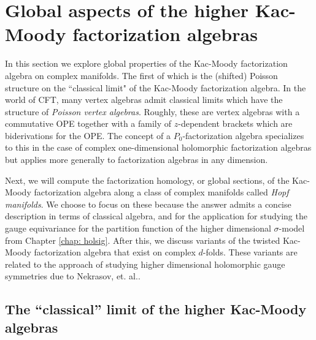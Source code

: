 \documentclass[10pt]{amsart}
\begin{document}


\section{Global aspects of the higher Kac-Moody factorization algebras}

In this section we explore global properties of the Kac-Moody factorization algebra on complex manifolds. 
The first of which is the (shifted) Poisson structure on the ``classical limit" of the Kac-Moody factorization algebra.
In the world of CFT, many vertex algebras admit classical limits which have the structure of {\em Poisson vertex algebras}. 
Roughly, these are vertex algebras with a commutative OPE together with a family of $z$-dependent brackets which are biderivations for the OPE.
The concept of a $P_0$-factorization algebra specializes to this in the case of complex one-dimensional holomorphic factorization algebras but applies more generally to factorization algebras in any dimension.

Next, we will compute the factorization homology, or global sections, of the Kac-Moody factorization algebra along a class of complex manifolds called {\em Hopf manifolds}.
We choose to focus on these because the answer admits a concise description in terms of classical algebra, and for the application for studying the gauge equivariance for the partition function of the higher dimensional $\sigma$-model from Chapter \ref{chap: holsig}. 
After this, we discuss variants of the twisted Kac-Moody factorization algebra that exist on complex $d$-folds.
These variants are related to the approach of studying higher dimensional holomorphic gauge symmetries due to Nekrasov, et. al..

\subsection{The ``classical'' limit of the higher Kac-Moody algebras}
\end{document}
